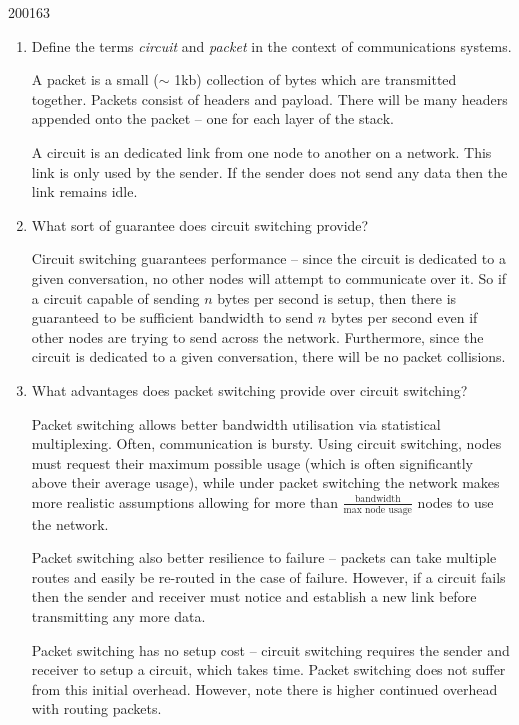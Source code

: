 \documentclass[10pt,\jkfside,a4paper]{article}
\begin{document}
\begin{examquestion}{2001}{6}{3}

\begin{enumerate}

\item Define the terms \textit{circuit} and \textit{packet} in the context
of communications systems.

A packet is a small ($\sim$ 1kb) collection of bytes which are transmitted
together. Packets consist of headers and payload. There will be many headers
appended onto the packet -- one for each layer of the stack.

A circuit is an dedicated link from one node to another on a network. This
link is only used by the sender. If the sender does not send any data then
the link remains idle.

\item What sort of guarantee does circuit switching provide?

Circuit switching guarantees performance -- since the circuit is dedicated
to a given conversation, no other nodes will attempt to communicate over it.
So if a circuit capable of sending $n$ bytes per second is setup, then there
is guaranteed to be sufficient bandwidth to send $n$ bytes per second even
if other nodes are trying to send across the network. Furthermore, since the
circuit is dedicated to a given conversation, there will be no packet
collisions.

\item What advantages does packet switching provide over circuit switching?

Packet switching allows better bandwidth utilisation via statistical
multiplexing. Often, communication is bursty. Using circuit switching, nodes
must request their maximum possible usage (which is often significantly
above their average usage), while under packet switching the network makes
more realistic assumptions allowing for more than
$\frac{\text{bandwidth}}{\text{max node usage}}$ nodes to use the network.

Packet switching also better resilience to failure -- packets can take
multiple routes and easily be re-routed in the case of failure. However, if
a circuit fails then the sender and receiver must notice and establish a new
link before transmitting any more data.

Packet switching has no setup cost -- circuit switching requires the sender
and receiver to setup a circuit, which takes time. Packet switching does not
suffer from this initial overhead. However, note there is higher continued
overhead with routing packets.


\end{enumerate}
\end{examquestion}
\end{document}
